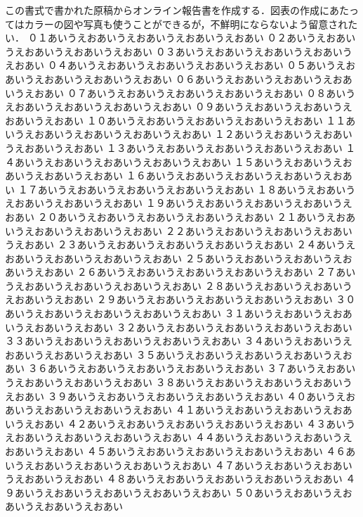 \documentclass[a4j]{article}
\begin{document}
\msnormalsize
この書式で書かれた原稿からオンライン報告書を作成する．図表の作成にあたってはカラーの図や写真も使うことができるが，不鮮明にならないよう留意されたい．
\newpage
\msnormalsize
\noindent%
０１あいうえおあいうえおあいうえおあいうえおあい
０２あいうえおあいうえおあいうえおあいうえおあい
０３あいうえおあいうえおあいうえおあいうえおあい
０４あいうえおあいうえおあいうえおあいうえおあい
０５あいうえおあいうえおあいうえおあいうえおあい
０６あいうえおあいうえおあいうえおあいうえおあい
０７あいうえおあいうえおあいうえおあいうえおあい
０８あいうえおあいうえおあいうえおあいうえおあい
０９あいうえおあいうえおあいうえおあいうえおあい
１０あいうえおあいうえおあいうえおあいうえおあい
１１あいうえおあいうえおあいうえおあいうえおあい
１２あいうえおあいうえおあいうえおあいうえおあい
１３あいうえおあいうえおあいうえおあいうえおあい
１４あいうえおあいうえおあいうえおあいうえおあい
１５あいうえおあいうえおあいうえおあいうえおあい
１６あいうえおあいうえおあいうえおあいうえおあい
１７あいうえおあいうえおあいうえおあいうえおあい
１８あいうえおあいうえおあいうえおあいうえおあい
１９あいうえおあいうえおあいうえおあいうえおあい
２０あいうえおあいうえおあいうえおあいうえおあい
２１あいうえおあいうえおあいうえおあいうえおあい
２２あいうえおあいうえおあいうえおあいうえおあい
２３あいうえおあいうえおあいうえおあいうえおあい
２４あいうえおあいうえおあいうえおあいうえおあい
２５あいうえおあいうえおあいうえおあいうえおあい
２６あいうえおあいうえおあいうえおあいうえおあい
２７あいうえおあいうえおあいうえおあいうえおあい
２８あいうえおあいうえおあいうえおあいうえおあい
２９あいうえおあいうえおあいうえおあいうえおあい
３０あいうえおあいうえおあいうえおあいうえおあい
３１あいうえおあいうえおあいうえおあいうえおあい
３２あいうえおあいうえおあいうえおあいうえおあい
３３あいうえおあいうえおあいうえおあいうえおあい
３４あいうえおあいうえおあいうえおあいうえおあい
３５あいうえおあいうえおあいうえおあいうえおあい
３６あいうえおあいうえおあいうえおあいうえおあい
３７あいうえおあいうえおあいうえおあいうえおあい
３８あいうえおあいうえおあいうえおあいうえおあい
３９あいうえおあいうえおあいうえおあいうえおあい
４０あいうえおあいうえおあいうえおあいうえおあい
４１あいうえおあいうえおあいうえおあいうえおあい
４２あいうえおあいうえおあいうえおあいうえおあい
４３あいうえおあいうえおあいうえおあいうえおあい
４４あいうえおあいうえおあいうえおあいうえおあい
４５あいうえおあいうえおあいうえおあいうえおあい
４６あいうえおあいうえおあいうえおあいうえおあい
４７あいうえおあいうえおあいうえおあいうえおあい
４８あいうえおあいうえおあいうえおあいうえおあい
４９あいうえおあいうえおあいうえおあいうえおあい
５０あいうえおあいうえおあいうえおあいうえおあい
\end{document}
